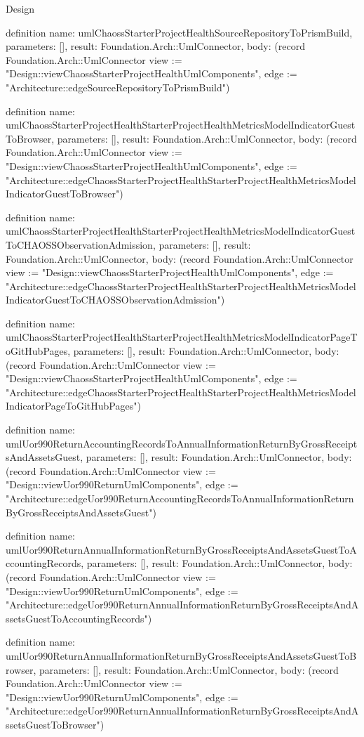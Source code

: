 \begin{lexlean}{Design}
\begin{semanticmodule}
definition{
  name: umlChaossStarterProjectHealthSourceRepositoryToPrismBuild,
  parameters: [],
  result: Foundation.Arch::UmlConnector,
  body: (record Foundation.Arch::UmlConnector {view := "Design::viewChaossStarterProjectHealthUmlComponents", edge := "Architecture::edgeSourceRepositoryToPrismBuild"})
}

definition{
  name: umlChaossStarterProjectHealthStarterProjectHealthMetricsModelIndicatorGuestToBrowser,
  parameters: [],
  result: Foundation.Arch::UmlConnector,
  body: (record Foundation.Arch::UmlConnector {view := "Design::viewChaossStarterProjectHealthUmlComponents", edge := "Architecture::edgeChaossStarterProjectHealthStarterProjectHealthMetricsModelIndicatorGuestToBrowser"})
}

definition{
  name: umlChaossStarterProjectHealthStarterProjectHealthMetricsModelIndicatorGuestToCHAOSSObservationAdmission,
  parameters: [],
  result: Foundation.Arch::UmlConnector,
  body: (record Foundation.Arch::UmlConnector {view := "Design::viewChaossStarterProjectHealthUmlComponents", edge := "Architecture::edgeChaossStarterProjectHealthStarterProjectHealthMetricsModelIndicatorGuestToCHAOSSObservationAdmission"})
}

definition{
  name: umlChaossStarterProjectHealthStarterProjectHealthMetricsModelIndicatorPageToGitHubPages,
  parameters: [],
  result: Foundation.Arch::UmlConnector,
  body: (record Foundation.Arch::UmlConnector {view := "Design::viewChaossStarterProjectHealthUmlComponents", edge := "Architecture::edgeChaossStarterProjectHealthStarterProjectHealthMetricsModelIndicatorPageToGitHubPages"})
}

definition{
  name: umlUor990ReturnAccountingRecordsToAnnualInformationReturnByGrossReceiptsAndAssetsGuest,
  parameters: [],
  result: Foundation.Arch::UmlConnector,
  body: (record Foundation.Arch::UmlConnector {view := "Design::viewUor990ReturnUmlComponents", edge := "Architecture::edgeUor990ReturnAccountingRecordsToAnnualInformationReturnByGrossReceiptsAndAssetsGuest"})
}

definition{
  name: umlUor990ReturnAnnualInformationReturnByGrossReceiptsAndAssetsGuestToAccountingRecords,
  parameters: [],
  result: Foundation.Arch::UmlConnector,
  body: (record Foundation.Arch::UmlConnector {view := "Design::viewUor990ReturnUmlComponents", edge := "Architecture::edgeUor990ReturnAnnualInformationReturnByGrossReceiptsAndAssetsGuestToAccountingRecords"})
}

definition{
  name: umlUor990ReturnAnnualInformationReturnByGrossReceiptsAndAssetsGuestToBrowser,
  parameters: [],
  result: Foundation.Arch::UmlConnector,
  body: (record Foundation.Arch::UmlConnector {view := "Design::viewUor990ReturnUmlComponents", edge := "Architecture::edgeUor990ReturnAnnualInformationReturnByGrossReceiptsAndAssetsGuestToBrowser"})
}


\end{semanticmodule}
\end{lexlean}

